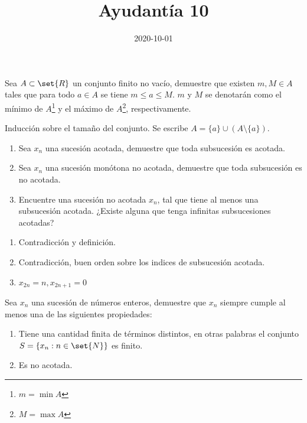 \documentclass{ayudantia}
\title{Ayudantía 10}
\date{2020-10-01}
\begin{document}
\maketitle

\begin{prob}
    Sea \(A\subset\set{R}\) un conjunto finito no vacío, demuestre que existen \(m,M\in A\) tales que para todo \(a\in A\) se tiene \(m\leq a\leq M\). \(m\) y \(M\) se denotarán como el mínimo de \(A\)\footnote{\(m=\min A\)} y el máximo de \(A\)\footnote{\(M=\max A\)}, respectivamente.
\end{prob}

\begin{ans}
    \begin{sol}
        Inducción sobre el tamaño del conjunto. Se escribe \(A=\{a\}\cup(A\setminus\{a\})\).
    \end{sol}
\end{ans}


\begin{prob}
    \begin{enumerate}
        \item Sea \(x_n\) una sucesión acotada, demuestre que toda subsucesión es acotada.
        \item Sea \(x_n\) una sucesión monótona no acotada, demuestre que toda subsucesión es no acotada.
        \item Encuentre una sucesión no acotada \(x_n\), tal que tiene al menos una subsucesión acotada. ¿Existe alguna que tenga infinitas subsucesiones acotadas?
    \end{enumerate}
\end{prob}

\begin{ans}
    \begin{sol}
        \begin{enumerate}
            \item Contradicción y definición.
            \item Contradicción, buen orden sobre los indices de subsucesión acotada.
            \item \(x_{2n}=n,x_{2n+1}=0\)
        \end{enumerate}
    \end{sol}
\end{ans}


\begin{prob}
    Sea \(x_n\) una sucesión de números enteros, demuestre que \(x_n\) siempre cumple al menos una de las siguientes propiedades:
    \begin{enumerate}[label=(\alph*)]
        \item Tiene una cantidad finita de términos distintos, en otras palabras el conjunto \(S=\{x_n:n\in\set{N}\}\) es finito.
        \item Es no acotada.
    \end{enumerate}
\end{prob}
\end{document}

